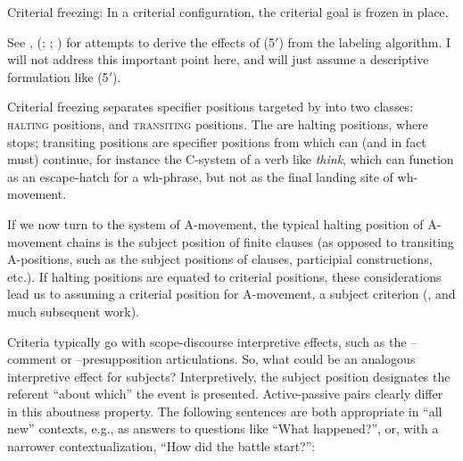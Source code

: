 \documentclass[output=paper]{langsci/langscibook}
\begin{document}
\begin{exe}
     Criterial freezing: In a criterial configuration, the criterial
    goal is frozen in place.\label{ex:21.5prime}
\z

See \textcite{Chomsky2013,Chomsky2015}, \citeauthor{Rizzi2015}
(\citeyear{Rizzi2015}; \citeyear{Rizzi2015b}; \citeyear{Rizzi2016a}) for
attempts to derive the effects of (5$'$) from the labeling algorithm. I will not
address this important point here, and will just assume a descriptive
formulation like (5$'$).

Criterial freezing separates specifier positions
targeted by  into two classes: \textsc{halting} positions, and
\textsc{transiting} positions. The  are halting
positions, where  stops; transiting positions are specifier positions
from which  can (and in fact must) continue, for instance the C-system
of a verb like \emph{think}, which can function as an escape-hatch for a
wh-phrase, but not as the final landing site of wh-movement.

If we now turn to the system of A-movement, the typical halting position of
A-movement chains is the subject position of finite clauses (as opposed to
transiting A-positions, such as the subject positions of  clauses,
participial constructions, etc.). If halting positions are equated to criterial
positions, these considerations lead us to assuming a criterial position for
A-movement, a subject criterion (\citealt{rizzicriterial}, and much subsequent
work).

Criteria typically go with scope-discourse interpretive effects, such as the\linebreak
{}--comment or --presupposition articulations. So, what could be an
analogous interpretive effect for subjects? Interpretively, the subject
position designates the referent “about which” the event is presented.
Active-passive pairs clearly differ in this aboutness property. The following
sentences are both appropriate in “all new” contexts, e.g., as answers to
questions like “What happened?”, or, with a narrower contextualization, “How
did the battle start?”:\pagebreak


\end{exe}
\end{document}
